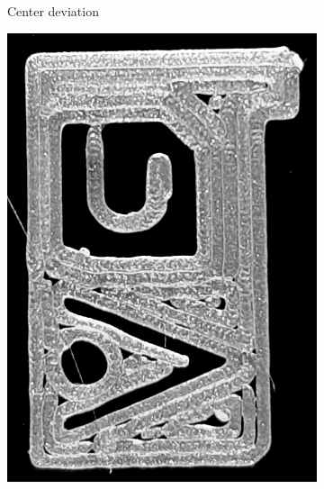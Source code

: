 \begin{figure}
\begin{subfigure}{\figwidth}
\caption{Center deviation}\label{print_center}
\end{subfigure}
\begin{subfigure}{\figwidth}\centering
\includegraphics[height=\figheightTwo]{sources/applications/gMAT_inward.png}

\end{subfigure}
\end{figure}
